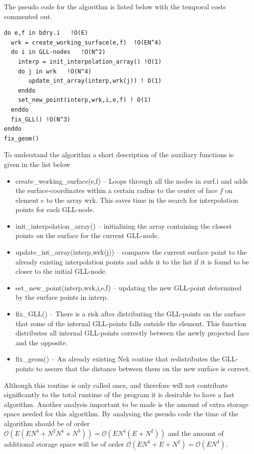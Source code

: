 The pseudo code for the algorithm is listed below with the temporal costs commented out.
%
\begingroup
\fontsize{12pt}{14pt}
\begin{lstlisting}[escapechar=|,frame=none]
do e,f in bdry.i   !O(E)
  wrk = create_working_surface(e,f)  !O(EN^4) 
  do i in GLL-nodes   !O(N^2)
    interp = init_interpolation_array() !O(1) 
    do j in wrk   !O(N^4)
       update_int_array(interp,wrk(j)) ! O(1)
    enddo
    set_new_point(interp,wrk,i,e,f) ! O(1)
  enddo
  fix_GLL() !O(N^3)
enddo
fix_geom()
\end{lstlisting}
\endgroup
% 
To understand the algorithm a short description of the auxiliary functions is 
given in the list below
\begin{itemize}
    \item create\_working\_surface(e,f) -- Loops through all the nodes in surf.i and adds the 
        surface-coordinates within a certain radius to the center of face $f$ on element $e$ to the array wrk.
        This saves time in the search for interpolation points for each GLL-node.
    \item init\_interpolation\_array() -- initializing the array containing the closest 
        points on the surface for the current GLL-node. 
    \item update\_int\_array(interp,wrk(j)) -- compares the current surface point to the 
        already existing interpolation points and adds it to the list if it is found to 
        be closer to the initial GLL-node.
    \item set\_new\_point(interp,wrk,i,e,f) -- updating the new GLL-point determined by the 
        surface points in interp.
    \item fix\_GLL() -- There is a risk after distributing the GLL-points on the surface that
        some of the internal GLL-points falls outside the element. This function distributes 
        all internal GLL-points correctly between the newly projected face and the opposite.
    \item fix\_geom() -- An already existing Nek routine that redistributes the GLL-points to 
        assure that the distance between them on the new surface is correct.
\end{itemize}

Although this routine is only called once, and therefore will not contribute significantly 
to the total runtime of the program it is desirable to have a fast algorithm. Another analysis
important to be made is the amount of extra storage space needed for this algorithm.
By analysing the pseudo code the time of the algorithm should be of order $\mathcal{O}(E(EN^4+N^2N^4+N^3))=\mathcal{O}(EN^4(E+N^2))$
and the amount of additional storage space will be of order $\mathcal{O}(EN^4+E+N^2)=\mathcal{O}(EN^4)$.

